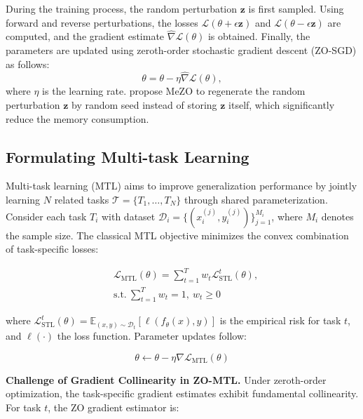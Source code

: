 During the training process, the random perturbation $\mathbf{z}$ is first sampled. Using forward and reverse perturbations, the losses $\mathcal{L}(\theta + \epsilon \mathbf{z})$ and $\mathcal{L}(\theta - \epsilon \mathbf{z})$ are computed, and the gradient estimate $\widehat{\nabla} \mathcal{L}(\theta)$ is obtained. Finally, the parameters are updated using zeroth-order stochastic gradient descent (ZO-SGD) as follows:
\begin{equation}
\theta = \theta - \eta \widehat{\nabla} \mathcal{L}(\theta),
\end{equation}
where $\eta$ is the learning rate.
\citet{malladi2023mezo} propose MeZO to regenerate the random perturbation $\mathbf{z}$ by random seed instead of storing $\mathbf{z}$ itself, which significantly reduce the memory consumption.


\subsection{Formulating Multi-task Learning}
\label{sec:reformmtl}

Multi-task learning (MTL) aims to improve generalization performance by jointly learning $N$ related tasks $\mathcal{T} = \{T_1, \dots, T_N\}$ through shared parameterization. Consider each task $T_i$ with dataset $\mathcal{D}_i = \{(x_i^{(j)}, y_i^{(j)})\}_{j=1}^{M_i}$, where $M_i$ denotes the sample size. The classical MTL objective minimizes the convex combination of task-specific losses:

\begin{align}
    & \mathcal{L}_{\text{MTL}}(\theta) = \sum_{t=1}^T w_t \mathcal{L}^t_{\text{STL}}(\theta),\\
    & \text{s.t.}\ \sum_{t=1}^T w_t = 1,\ w_t \geq 0
\end{align}

where $\mathcal{L}^t_{\text{STL}}(\theta) = \mathbb{E}_{(x,y)\sim\mathcal{D}_t}[\ell(f_\theta(x), y)]$ is the empirical risk for task $t$, and $\ell(\cdot)$ the loss function. Parameter updates follow:

\begin{equation}
    \theta \leftarrow \theta - \eta \nabla\mathcal{L}_{\text{MTL}}(\theta)
\end{equation}

\noindent\textbf{Challenge of Gradient Collinearity in ZO-MTL.} Under zeroth-order optimization, the task-specific gradient estimates exhibit fundamental collinearity. For task $t$, the ZO gradient estimator is:

